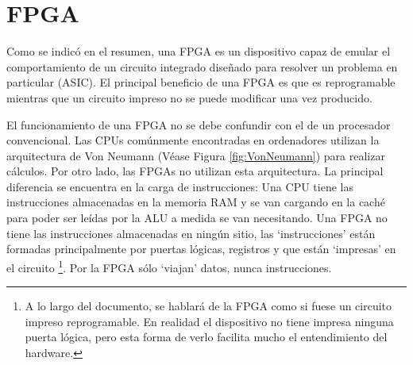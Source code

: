 \section{FPGA}
\label{sec:FPGA}

Como se indicó en el resumen, una FPGA es un dispositivo capaz de emular
el comportamiento de un circuito integrado diseñado para resolver un problema
en particular (ASIC).
El principal beneficio de una FPGA es que es reprogramable
mientras que un circuito impreso no se puede modificar una vez producido.

El funcionamiento de una FPGA no se debe confundir con el de un procesador convencional.
Las CPUs comúnmente encontradas en ordenadores utilizan la arquitectura de Von Neumann
(Véase Figura \ref{fig:VonNeumann}) para realizar cálculos.
Por otro lado, las FPGAs no utilizan esta arquitectura.
La principal diferencia se encuentra en la carga de instrucciones:
Una CPU tiene las instrucciones almacenadas en la memoria RAM
y se van cargando en la caché para poder ser leídas por la ALU
a medida se van necesitando.
Una FPGA no tiene las instrucciones almacenadas en ningún sitio,
las `instrucciones' están formadas principalmente por  puertas lógicas, registros y
 que están `impresas' en el circuito
\footnote{
    A lo largo del documento, se hablará de la FPGA como si fuese un circuito impreso
    reprogramable.
    En realidad el dispositivo no tiene impresa ninguna puerta lógica,
    pero esta forma de verlo facilita mucho el entendimiento del hardware.
}.
Por la FPGA sólo `viajan' datos, nunca instrucciones.

